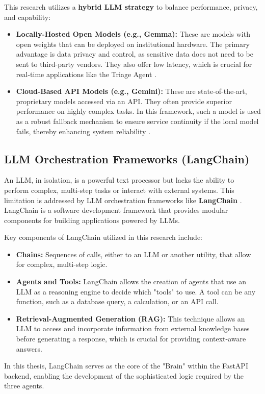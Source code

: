 This research utilizes a \textbf{hybrid LLM strategy} to balance performance, privacy, and capability:
\begin{itemize}
    \item \textbf{Locally-Hosted Open Models (e.g., Gemma):} These are models with open weights that can be deployed on institutional hardware. The primary advantage is data privacy and control, as sensitive data does not need to be sent to third-party vendors. They also offer low latency, which is crucial for real-time applications like the Triage Agent \cite{FIND_CITATION_PLEASE}.
    \item \textbf{Cloud-Based API Models (e.g., Gemini):} These are state-of-the-art, proprietary models accessed via an API. They often provide superior performance on highly complex tasks. In this framework, such a model is used as a robust fallback mechanism to ensure service continuity if the local model fails, thereby enhancing system reliability \cite{FIND_CITATION_PLEASE}.
\end{itemize}

\subsection{LLM Orchestration Frameworks (LangChain)}
\label{subsec:langchain}

An LLM, in isolation, is a powerful text processor but lacks the ability to perform complex, multi-step tasks or interact with external systems. This limitation is addressed by LLM orchestration frameworks like \textbf{LangChain} \cite{FIND_CITATION_PLEASE}. LangChain is a software development framework that provides modular components for building applications powered by LLMs.

Key components of LangChain utilized in this research include:
\begin{itemize}
    \item \textbf{Chains:} Sequences of calls, either to an LLM or another utility, that allow for complex, multi-step logic.
    \item \textbf{Agents and Tools:} LangChain allows the creation of agents that use an LLM as a reasoning engine to decide which "tools" to use. A tool can be any function, such as a database query, a calculation, or an API call.
    \item \textbf{Retrieval-Augmented Generation (RAG):} This technique allows an LLM to access and incorporate information from external knowledge bases before generating a response, which is crucial for providing context-aware answers.
\end{itemize}
In this thesis, LangChain serves as the core of the "Brain" within the FastAPI backend, enabling the development of the sophisticated logic required by the three agents.

